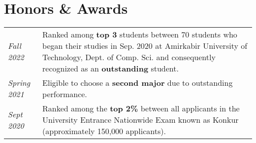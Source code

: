 
	\section{Honors \& Awards} 

\begin{tabular}{l|p{}}
	\textit{Fall 2022} & 
	Ranked among \textbf{top 3} students between 70 students who began their studies in Sep. 2020 at Amirkabir University of Technology, Dept. of Comp. Sci. and consequently recognized as an \textbf{outstanding} student. \\
	\textit{Spring 2021} & 
	Eligible to choose a \textbf{second major} due to outstanding performance. \\
	\textit{Sept 2020} & 
	Ranked among the \textbf{top 2\%} between all applicants in the University Entrance Nationwide Exam known as Konkur (approximately 150,000 applicants). \\
\end{tabular}
